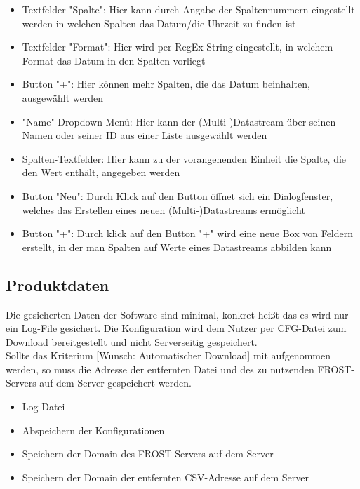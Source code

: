 \documentclass[12 pt]{article}
\begin{document}
\begin{itemize}
\item Textfelder "Spalte": Hier kann durch Angabe der Spaltennummern eingestellt werden in welchen Spalten das Datum/die Uhrzeit zu finden ist
\item Textfelder "Format": Hier wird per RegEx-String eingestellt, in welchem Format das Datum in den Spalten vorliegt
\item Button "+": Hier können mehr Spalten, die das Datum beinhalten, ausgewählt werden

\item "Name"-Dropdown-Menü: Hier kann der (Multi-)Datastream über seinen Namen oder seiner ID aus einer Liste ausgewählt werden
\item Spalten-Textfelder: Hier kann zu der vorangehenden Einheit die Spalte, die den Wert enthält, angegeben werden
\item Button "Neu": Durch Klick auf den Button öffnet sich ein Dialogfenster, welches das Erstellen eines neuen (Multi-)Datastreams ermöglicht
\item Button "+": Durch klick auf den Button "+" wird eine neue Box von Feldern erstellt, in der man Spalten auf Werte eines Datastreams abbilden kann
\end{itemize}

\subsection{Produktdaten}
Die gesicherten Daten der Software sind minimal, konkret heißt das es wird nur ein Log-File gesichert. Die Konfiguration wird dem Nutzer per CFG-Datei zum Download bereitgestellt und nicht Serverseitig gespeichert.\\
Sollte das Kriterium [Wunsch: Automatischer Download] mit aufgenommen werden, so muss die Adresse der entfernten Datei und des zu nutzenden FROST-Servers auf dem Server gespeichert werden.
\begin{itemize}
\item Log-Datei
\item Abspeichern der Konfigurationen
\item Speichern der Domain des FROST-Servers auf dem Server
\item Speichern der Domain der entfernten CSV-Adresse auf dem Server
\end{itemize}
\end{document}
